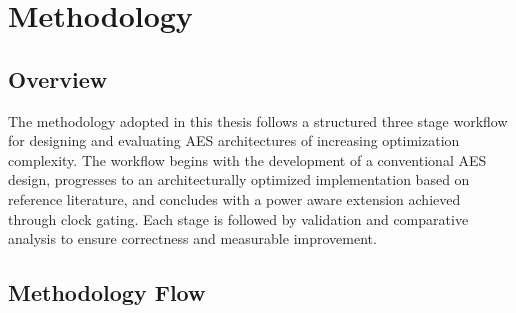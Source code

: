 \chapter{Methodology}

\section{Overview}

The methodology adopted in this thesis follows a structured three stage workflow for 
designing and evaluating AES architectures of increasing optimization complexity. The 
workflow begins with the development of a conventional AES design, progresses to an 
architecturally optimized implementation based on reference literature, and concludes with 
a power aware extension achieved through clock gating. Each stage is followed by validation 
and comparative analysis to ensure correctness and measurable improvement.

\section{Methodology Flow}

